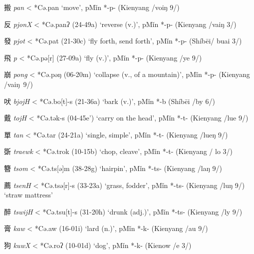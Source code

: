 \begin{description} \item
搬 \emph{pan} \textless{} *Cə.p{}an `move', pMǐn *-p- (Kienyang /voiŋ 9/)

\item
反 \emph{pjonX} \textless{} *Cə.panʔ (24-49a) `reverse (v.)', pMǐn *-p-
(Kienyang /vaiŋ 3/)

\item
發 \emph{pjot} \textless{} *Cə.pat (21-30c) `fly forth, send forth',
pMǐn *-p- (Shíbēi/ buai 3/)

\item
飛 \emph{p{}} \textless{} *Cə.pə{[}r] (27-09a) `fly (v.)', pMǐn *-p-
(Kienyang /ye 9/)

\item
崩 \emph{pong} \textless{} *Cə.p{}əŋ (06-20m) `collapse (v., of a
mountain)', pMǐn *-p- (Kienyang /vaiŋ~9/)

\item
吠 \emph{bjojH} \textless{} *Cə.bo{[}t]-s (21-36a) `bark (v.)', pMǐn
*-b (Shíbēi /by 6/)

\item
戴 \emph{tojH} \textless{} *Cə.t{}ək-s (04-45e') `carry on the head',
pMǐn *-t- (Kienyang /lue 9/)

\item
單 \emph{tan} \textless{} *Cə.t{}ar (24-21a) `single, simple', pMǐn *-t-
(Kienyang /lueŋ 9/)

\item
斲 \emph{traewk} \textless{} *Cə.t{}rok (10-15b) `chop, cleave', pMǐn
*-t- (Kienyang / lo 3/)

\item
簪 \emph{tsom} \textless{} *Cə.ts{}{[}ə]m (38-28g) `hairpin', pMǐn
*-ts- (Kienyang /laŋ 9/)

\item
薦 \emph{tsenH} \textless{} *Cə.ts{}ə{[}r]-s (33-23a) `grass, fodder',
pMǐn *-ts- (Kienyang /luŋ 9/) `straw mattress'

\item
醉 \emph{tswijH} \textless{} *Cə.tsu{[}t]-s (31-20h) `drunk (adj.)',
pMǐn *-ts- (Kienyang /ly 9/)

\item
膏 \emph{kaw} \textless{} *Cə.{}aw (16-01i) `lard (n.)', pMǐn *-k-
(Kienyang /au 9/)

\item
狗 \emph{kuwX} \textless{} *Cə.{}roʔ (10-01d) `dog', pMǐn *-k- (Kienow
/e 3/)


\end{description}
